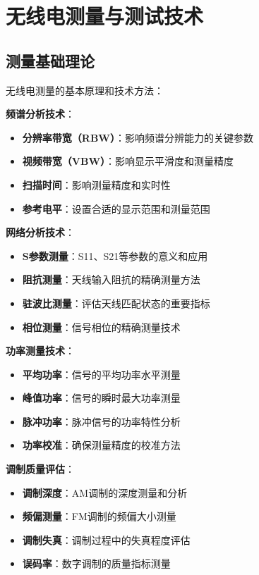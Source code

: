 \documentclass[12pt,UTF8]{ctexbook}
\begin{document}
\chapter{无线电测量与测试技术}

\section{测量基础理论}

无线电测量的基本原理和技术方法：

\textbf{频谱分析技术}：
\begin{itemize}[leftmargin=3.5em]
    \item \textbf{分辨率带宽（RBW）}：影响频谱分辨能力的关键参数
    \item \textbf{视频带宽（VBW）}：影响显示平滑度和测量精度
    \item \textbf{扫描时间}：影响测量精度和实时性
    \item \textbf{参考电平}：设置合适的显示范围和测量范围
\end{itemize}

\textbf{网络分析技术}：
\begin{itemize}[leftmargin=3.5em]
    \item \textbf{S参数测量}：S11、S21等参数的意义和应用
    \item \textbf{阻抗测量}：天线输入阻抗的精确测量方法
    \item \textbf{驻波比测量}：评估天线匹配状态的重要指标
    \item \textbf{相位测量}：信号相位的精确测量技术
\end{itemize}

\textbf{功率测量技术}：
\begin{itemize}[leftmargin=3.5em]
    \item \textbf{平均功率}：信号的平均功率水平测量
    \item \textbf{峰值功率}：信号的瞬时最大功率测量
    \item \textbf{脉冲功率}：脉冲信号的功率特性分析
    \item \textbf{功率校准}：确保测量精度的校准方法
\end{itemize}

\textbf{调制质量评估}：
\begin{itemize}[leftmargin=3.5em]
    \item \textbf{调制深度}：AM调制的深度测量和分析
    \item \textbf{频偏测量}：FM调制的频偏大小测量
    \item \textbf{调制失真}：调制过程中的失真程度评估
    \item \textbf{误码率}：数字调制的质量指标测量
\end{itemize}
\end{document}
